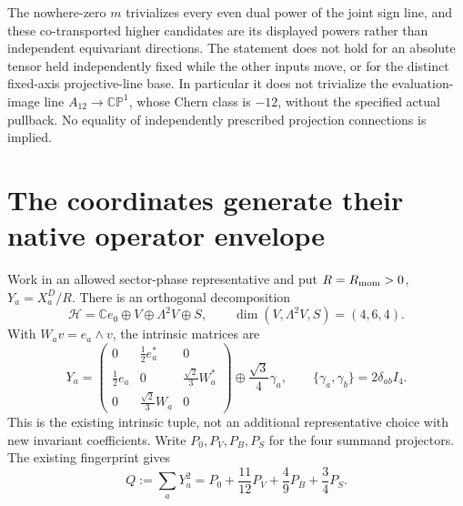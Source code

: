 \documentclass[11pt]{article}
\begin{document}
\begin{remark}
The nowhere-zero \(m\) trivializes every even dual power of the joint
sign line, and these co-transported higher candidates are its displayed
powers rather than independent equivariant directions. The statement
does not hold for an absolute tensor held independently fixed while the
other inputs move, or for the distinct fixed-axis projective-line base.
In particular it does not trivialize the evaluation-image line
\(A_{12}\to\mathbb{CP}^1\), whose Chern class is \(-12\), without
the specified actual pullback. No equality of independently prescribed
projection connections is implied.
\end{remark}

\section{The coordinates generate their native operator envelope}
\label{p1:sec:v226-coordinates}

Work in an allowed sector-phase representative and put $R=R_{\rm mom}>0$,
$Y_a=X_a^D/R$. There is an orthogonal decomposition
\[
 \mathcal H=\mathbb{C} e_0\oplus V\oplus\Lambda^2V\oplus S,
 \qquad \dim(V,\Lambda^2V,S)=(4,6,4).
\]
With $W_av=e_a\wedge v$, the intrinsic matrices are
\begin{equation}\label{p1:eq:v226-matrix}
 Y_a=
 \begin{pmatrix}
 0&\frac12 e_a^*&0\\
 \frac12e_a&0&\frac{\sqrt2}{3}W_a^*\\
 0&\frac{\sqrt2}{3}W_a&0
 \end{pmatrix}
 \oplus \frac{\sqrt3}{4}\gamma_a,
 \qquad \{\gamma_a,\gamma_b\}=2\delta_{ab}I_4.
\end{equation}
This is the existing intrinsic tuple, not an additional representative choice
with new invariant coefficients. Write $P_0,P_V,P_B,P_S$ for the four
summand projectors. The existing fingerprint gives
\begin{equation}\label{p1:eq:v226-Q}
 Q:=\sum_aY_a^2=P_0+\frac{11}{12}P_V+\frac49P_B+\frac34P_S.
\end{equation}
\end{document}
